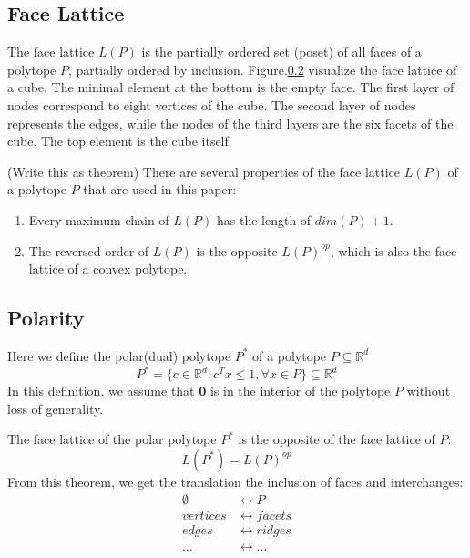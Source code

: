 \documentclass[conference]{IEEEtran}
\begin{document}
\subsection{Face Lattice}
The face lattice $L(P)$ is the partially ordered set (poset) of all faces of a polytope $P$, partially ordered by inclusion. Figure.\ref{} visualize the face lattice of a cube. The minimal element at the bottom is the empty face. The first layer of nodes correspond to eight vertices of the cube. The second layer of nodes represents the edges, while the nodes of the third layers are the six facets of the cube. The top element is the cube itself. 

(Write this as theorem) There are several properties of the face lattice $L(P)$ of a polytope $P$ that are used in this paper:
\begin{enumerate}
    \item Every maximum chain of $L(P)$ has the length of $dim(P) + 1$. 
    \item The reversed order of $L(P)$ is the opposite $L(P)^{op}$, which is also the face lattice of a convex polytope.
\end{enumerate}


\subsection{Polarity}
Here we define the polar(dual) polytope $P^*$ of a polytope $P \subseteq \mathbb{R}^d$ 
\begin{equation}
    P^* = \{c \in \mathbb{R}^d: c^T x \leq 1, \forall x \in P\} \subseteq \mathbb{R}^d
\end{equation}
In this definition, we assume that $\mathbf{0}$ is in the interior of the polytope $P$ without loss of generality.   

The face lattice of the polar polytope $P^*$ is the opposite of the face lattice of $P$:
\begin{equation}
    L(P^*) = L(P)^{op}
\end{equation}
From this theorem, we get the translation the inclusion of faces and interchanges:
\begin{align}
    \emptyset &\longleftrightarrow P \\
    vertices &\longleftrightarrow facets \\
    edges &\longleftrightarrow ridges \\
    ... &\longleftrightarrow ...
\end{align}
\end{document}
